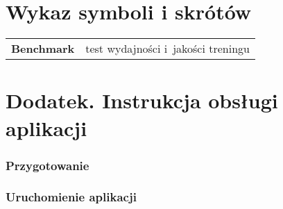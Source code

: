 \documentclass[pl]{minipw} %
\begin{document}

\begin{thebibliography}{20}%

\end{thebibliography}



\chapter*{Wykaz symboli i skrótów}

\begin{tabularx}{\textwidth}{cX}
\textbf{Benchmark} & test wydajności i~jakości treningu \\

\end{tabularx}


\listoffigures


\listoftables

\chapter*{Dodatek. Instrukcja obsługi aplikacji}
\subsection*{Przygotowanie}
 
\subsection*{Uruchomienie aplikacji}

\clearpage
\end{document}
